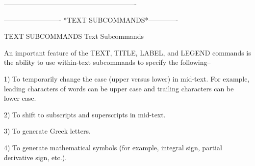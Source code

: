 ----------------------------------------------------------


















































































-------------------------  *TEXT SUBCOMMANDS*-------------
 
TEXT SUBCOMMANDS
Text Subcommands
 
An important feature of the TEXT, TITLE, LABEL, and LEGEND commands is
the ability to use within-text subcommands to specify the following--
 
   1) To temporarily change the case (upper versus lower) in mid-text.
      For example, leading characters of words can be upper case and
      trailing characters can be lower case.
 
   2) To shift to subscripts and superscripts in mid-text.
 
   3) To generate Greek letters.
 
   4) To generate mathematical symbols (for example, integral sign,
      partial derivative sign, etc.).
 
